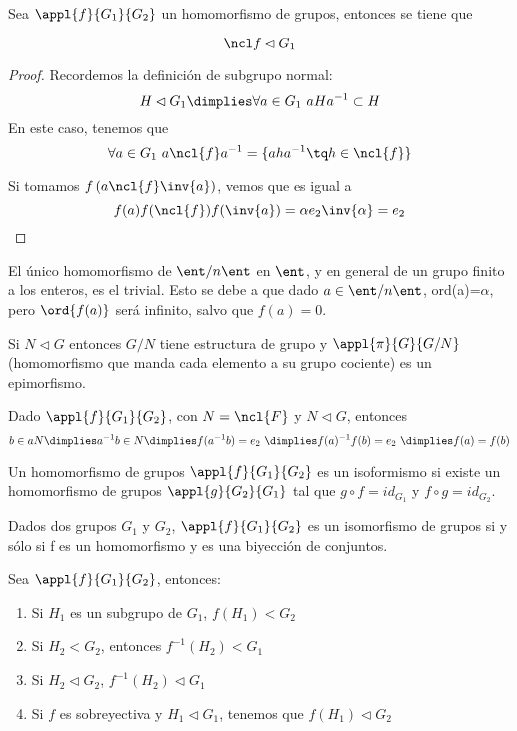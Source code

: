 \documentclass[nochap]{apuntes}
\begin{document}
\begin{lemma} Sea $\appl{f}{G_1}{G_2}$ un homomorfismo de grupos, entonces se tiene que

\[ \ncl f \lhd G_1 \]
\end{lemma}

\begin{proof} Recordemos la definición de subgrupo normal:
\[ H \lhd G_1 \dimplies \forall a\in G_1\ aHa^{-1}\subset H \]
En este caso, tenemos que
\[ \forall a\in G_1\ a\ncl{f}a^{-1} = \{aha^{-1} \tq h\in \ncl{f} \} \]

Si tomamos $f\left(a\ncl{f}\inv{a}\right)$, vemos que es igual a \[ f(a) f(\ncl{f}) f(\inv{a}) = \alpha e_2 \inv{\alpha} = e_2 \]
\end{proof}

\begin{remark}El único homomorfismo de $\ent/n\ent$  en $\ent$, y en general de un grupo finito a los enteros, es el trivial. Esto se debe
a que dado $a\in\ent/n\ent$, ord(a)=$\alpha$, pero $\ord{f(a)}$ será infinito, salvo que $f(a)=0$.\end{remark}
  
\begin{lemma} Si $N\lhd G$ entonces $G/N$ tiene estructura de grupo y $\appl{\pi}{G}{G/N}$  (homomorfismo que manda cada
elemento a su grupo cociente)  es un epimorfismo.
\end{lemma}

\begin{lemma} Dado $\appl{f}{G_1}{G_2}$, con $N=\ncl{F}$ y $N \lhd G$, entonces
\[ b\in aN \dimplies  a^{-1}b\in N \dimplies f(a^{-1}b)=e_2 \ \dimplies f(a)^{-1}f(b)=e_2 \ \dimplies f(a)=f(b) \]
\end{lemma}

\begin{defn}[Isomorfismo]
Un homomorfismo de grupos $\appl{f}{G_1}{G_2}$ es un isoformismo si existe un homomorfismo de grupos $\appl{g}{G_2}{G_1}$ tal que $g\circ f = id_{G_1}$ y $f\circ g = id_{G_2}$. 
\end{defn}

\begin{remark} Dados dos grupos $G_1$ y $G_2$, $\appl{f}{G_1}{G_2}$ es un isomorfismo de grupos si y sólo si f es un homomorfismo y es una biyección de conjuntos.
\end{remark}

\begin{lemma}\label{lemPropsHF}
Sea $\appl{f}{G_1}{G_2}$, entonces:
\begin{enumerate}
\item Si $H_1$ es un subgrupo de $G_1$, $f(H_1)<G_2$
\item Si $H_2 < G_2$, entonces $f^{-1}(H_2)<G_1$
\item Si $H_2 \lhd G_2$, $f^{-1}(H_2)\lhd G_1$
\item Si $f$ es sobreyectiva y $H_1\lhd G_1$, tenemos que $f(H_1)\lhd G_2$
\end{enumerate}
\end{lemma}
\end{document}
